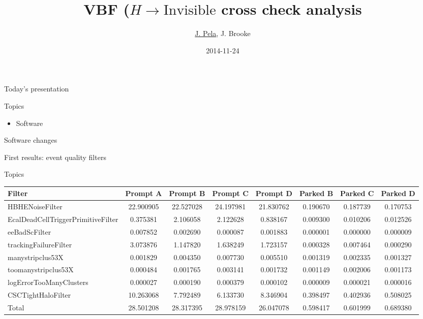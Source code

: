 \documentclass[8pt]{beamer}
\author[J. Pela]{\underline{J. Pela}, J. Brooke}
\title{VBF ($H\rightarrow\text{Invisible}$ cross check analysis}
\institute[ICL]{Imperial College London}
\date{2014-11-24}
\begin{document}
\setlength{\unitlength}{1mm}

\begin{frame}
  \titlepage
\end{frame}

\begin{frame}{Today's presentation}
 
\begin{block}{Topics}
 
\begin{itemize}
  \item Software 
\end{itemize}

\end{block}

\end{frame}

\begin{frame}{Software changes}
 


\end{frame}

\begin{frame}{First results: event quality filters}


\begin{block}{Topics}
\centering

\begin{tabular}{|l||c|c|c|c||c|c|c|}
\hline
Filter & Prompt A & Prompt B & Prompt C & Prompt D & Parked B & Parked C & Parked D \\
\hline \hline
HBHENoiseFilter & 22.900905 & 22.527028 & 24.197981 & 21.830762 & 0.190670 & 0.187739 & 0.170753 \\
EcalDeadCellTriggerPrimitiveFilter & 0.375381 & 2.106058 & 2.122628 & 0.838167 & 0.009300 & 0.010206 & 0.012526 \\
eeBadScFilter & 0.007852 & 0.002690 & 0.000087 & 0.001883 & 0.000001 & 0.000000 & 0.000009 \\
trackingFailureFilter & 3.073876 & 1.147820 & 1.638249 & 1.723157 & 0.000328 & 0.007464 & 0.000290 \\
manystripclus53X & 0.001829 & 0.004350 & 0.007730 & 0.005510 & 0.001319 & 0.002335 & 0.001327 \\
toomanystripclus53X & 0.000484 & 0.001765 & 0.003141 & 0.001732 & 0.001149 & 0.002006 & 0.001173 \\
logErrorTooManyClusters & 0.000027 & 0.000190 & 0.000379 & 0.000102 & 0.000009 & 0.000021 & 0.000016 \\
CSCTightHaloFilter & 10.263068 & 7.792489 & 6.133730 & 8.346904 & 0.398497 & 0.402936 & 0.508025 \\
\hline
Total & 28.501208 & 28.317395 & 28.978159 & 26.047078 & 0.598417 & 0.601999 & 0.689380 \\
\hline
\end{tabular}

\end{block}

\end{frame}
\end{document}
